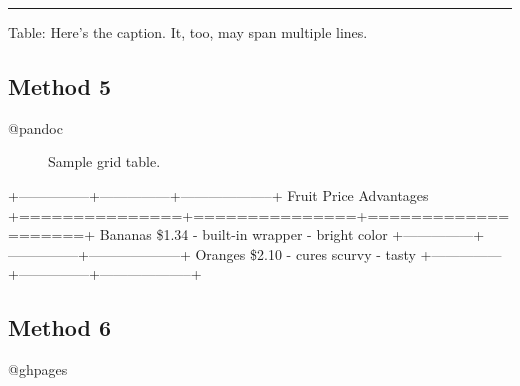 \begin{center}\rule{3in}{0.4pt}\end{center}


Table: Here's the caption. It, too, may span
multiple lines.

\subsection{Method 5}
\label{method5}

\begin{description}

\item[@pandoc]

Sample grid table.
\end{description}

+---------------+---------------+--------------------+
\textbar{} Fruit \textbar{} Price \textbar{} Advantages \textbar{}
+===============+===============+====================+
\textbar{} Bananas \textbar{} \$1.34 \textbar{} - built-in wrapper \textbar{}
\textbar{} \textbar{} \textbar{} - bright color \textbar{}
+---------------+---------------+--------------------+
\textbar{} Oranges \textbar{} \$2.10 \textbar{} - cures scurvy \textbar{}
\textbar{} \textbar{} \textbar{} - tasty \textbar{}
+---------------+---------------+--------------------+ 

\subsection{Method 6}
\label{method6}

@ghpages

